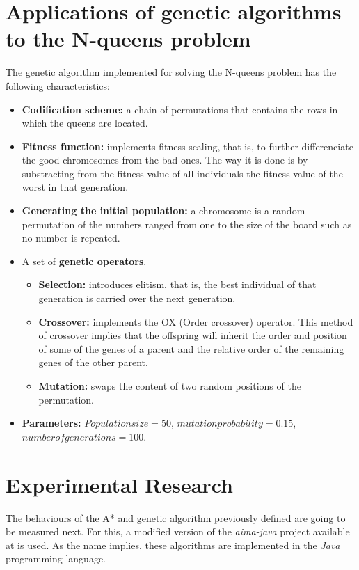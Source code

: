 \documentclass[]{llncs}
\begin{document}
\section{Applications of genetic algorithms to the N-queens problem}\label{gen_nqueens}
The genetic algorithm implemented for solving the N-queens problem has the following characteristics:
\begin{itemize}
    \item \textbf{Codification scheme:} a chain of permutations that contains the rows in which the queens are located.
    \item \textbf{Fitness function:} implements fitness scaling, that is, to further differenciate the good chromosomes from the bad ones. The way it is done is by substracting from the fitness value of all individuals the fitness value of the worst in that generation. 
    \item \textbf{Generating the initial population:} a chromosome is a random permutation of the numbers ranged from one to the size of the board such as no number is repeated.
    \item A set of \textbf{genetic operators}. 
    \begin{itemize}
        \item \textbf{Selection:} introduces elitism, that is, the best individual of that generation is carried over the next generation.
        \item \textbf{Crossover:} implements the OX (Order crossover) operator. This method of crossover implies that the offspring will inherit the order and position of some of the genes of a parent and the relative order of the remaining genes of the other parent.
        \item \textbf{Mutation:} swaps the content of two random positions of the permutation.
    \end{itemize}
    \item \textbf{Parameters:} $Population size = 50$, $mutation probability = 0.15$, $number of generations = 100$.
\end{itemize}
\section{Experimental Research}\label{exp_research}
The behaviours of the A* and genetic algorithm previously defined are going to be measured next. For this, a modified version of the \textit{aima-java} project available at \cite{aimajava} is used. As the name implies, these algorithms are implemented in the \textit{Java} programming language.
\end{document}

